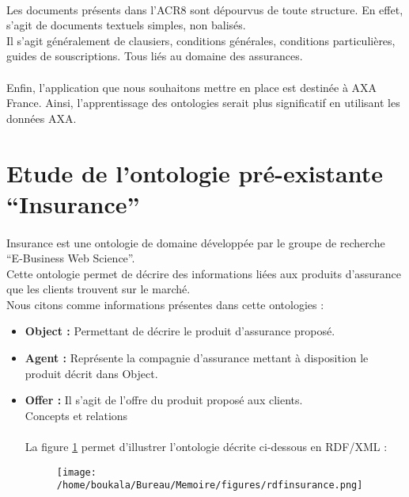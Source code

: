 \documentclass[12pt, a4paper, oneside]{book}
\begin{document}
\paragraph{}
Les documents présents dans l'ACR8 sont dépourvus de toute structure.
En effet, s'agit de documents textuels simples, non balisés.\\
Il s'agit généralement de clausiers, conditions générales, conditions particulières, guides de souscriptions. Tous liés au domaine des assurances.
\paragraph{}
Enfin, l'application que nous souhaitons mettre en place est destinée à AXA France. Ainsi, l'apprentissage des ontologies serait plus significatif en utilisant les données AXA.

\section{Etude de l'ontologie pré-existante “Insurance”}
\paragraph{}
Insurance est une ontologie de domaine développée par le groupe de recherche “E-Business Web Science”. \\
Cette ontologie permet de décrire des informations liées aux produits d'assurance que les clients trouvent sur le marché.\\
Nous citons comme informations présentes dans cette ontologies : \\

\begin{itemize}

\item \textbf{Object : }Permettant de décrire le produit d'assurance proposé.\\
\item \textbf{Agent : }Représente la compagnie d'assurance mettant à disposition le produit décrit dans Object.\\
\item \textbf{Offer : }Il s'agit de l'offre du produit proposé aux clients.\\
Concepts et relations


\paragraph{}
La figure \ref{exempleOnto} permet d’illustrer l’ontologie décrite ci-dessous en RDF/XML : 

\begin{figure}[h!]
\begin{center}
\texttt{[image: /home/boukala/Bureau/Memoire/figures/rdfinsurance.png]}
\label{exempleOnto}
\end{center}
\end{figure}



\end{itemize}
\end{document}
